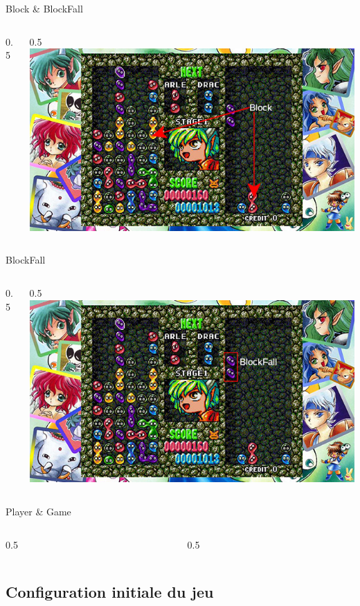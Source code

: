 \documentclass[10pt,dvipsnames,final]{beamer}
\newcommand{\midcolumn}[2]{
\begin{columns}
	\begin{column}{0.5\textwidth}
		#1
	\end{column}
	\begin{column}{0.5\textwidth}
		#2
	\end{column}
\end{columns}
}
\begin{document}
\begin{frame}{Block \& BlockFall}
\midcolumn{}{\includegraphics[width=\textwidth]{presentationfiles/block-img}}
\end{frame}

\begin{frame}{BlockFall}
\midcolumn{}{\includegraphics[width=\textwidth]{presentationfiles/BlockFall}}
\end{frame}

\begin{frame}{Player \& Game}
\midcolumn{}{}
\end{frame}

\subsection{Configuration initiale du jeu}
\end{document}
